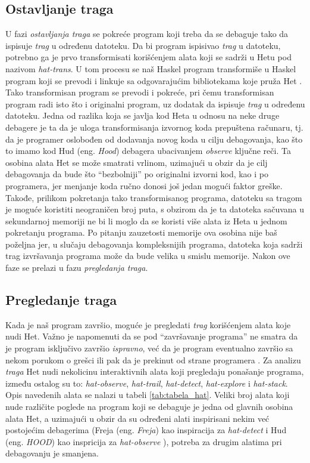 \documentclass[a4paper]{article}
\begin{document}
\subsection{Ostavljanje traga}
U fazi {\em ostavljanja traga} se pokreće program koji treba da se debaguje tako da ispisuje {\em trag} u određenu datoteku. Da bi program ispisivao {\em trag} u datoteku,
potrebno ga je prvo transformisati korišćenjem alata koji se sadrži u Hetu pod nazivom {\em hat-trans}. U tom procesu se naš Haskel program transformiše u
Haskel program koji se prevodi i linkuje sa odgovarajućim bibliotekama koje pruža Het \cite{chitil2002transforming}. Tako transformisan program se prevodi i pokreće,
pri čemu transformisan program radi isto što i originalni program, uz dodatak da ispisuje {\em trag} u određenu datoteku. %
Jedna od razlika koja se javlja kod Heta u odnosu na neke druge debagere je ta da je uloga transformisanja izvornog koda prepuštena računaru, tj. da je programer oslobođen od dodavanja novog koda u cilju debagovanja, kao što to imamo kod Hud (eng. {\em Hood}) debagera ubacivanjem {\em observe} ključne reči.
Ta osobina alata Het se može smatrati vrlinom, uzimajući u obzir da je cilj debagovanja da bude što ``bezbolniji'' po originalni izvorni kod, kao i po programera, jer menjanje koda ručno donosi još jedan mogući faktor greške. 
Takođe, prilikom pokretanja tako transformisanog programa, datoteku sa tragom je moguće koristiti neograničen broj puta, s obzirom da je ta datoteka sačuvana u sekundarnoj memoriji ne bi li moglo da se koristi više alata iz Heta u jednom pokretanju programa.
Po pitanju zauzetosti memorije ova osobina nije baš poželjna jer, u slučaju debagovanja kompleksnijih programa, datoteka koja sadrži trag izvršavanja programa može da bude velika u smislu memorije.
Nakon ove faze se prelazi u fazu {\em pregledanja traga}.

\subsection{Pregledanje traga}
Kada je naš program završio, moguće je pregledati {\em trag} korišćenjem alata koje nudi Het. Važno je napomenuti da se pod ``završavanje programa'' ne smatra 
da je program isključivo završio {\em ispravno}, već da je program eventualno završio sa nekom porukom o grešci ili pak da je prekinut od strane programera \cite{hat_haskell_org}.
Za analizu {\em traga} Het nudi nekolicinu interaktivnih alata koji pregledaju ponašanje programa, 
između ostalog su to: {\em hat-observe}, {\em hat-trail}, {\em hat-detect}, {\em hat-explore} i {\em hat-stack}. Opis navedenih alata se nalazi u tabeli \ref{tab:tabela_hat}.
Veliki broj alata koji nude različite poglede na program koji se debaguje je jedna od glavnih osobina alata Het, a uzimajući u obzir da su određeni alati inspirisani nekim već postojećim debagerima (Freja (eng. {\em Freja}) kao inspiracija za {\em hat-detect} i Hud (eng. {\em HOOD}) kao inspricija za {\em hat-observe} \cite{hat_haskell_org}), potreba za drugim alatima pri debagovanju je smanjena.
\end{document}
